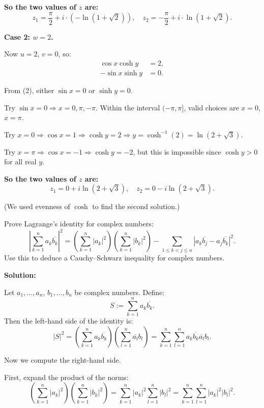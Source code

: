 \textbf{So the two values of \( z \) are:}
\[
z_1 = \frac{\pi}{2} + i \cdot (-\ln(1 + \sqrt{2})), \quad
z_2 = -\frac{\pi}{2} + i \cdot \ln(1 + \sqrt{2}).
\]

\vspace{0.5em}
\textbf{Case 2: \( w = 2 \).}

Now \( u = 2 \), \( v = 0 \), so:
\begin{align*}
\cos x \cosh y &= 2, \\
- \sin x \sinh y &= 0.
\end{align*}

From (2), either \( \sin x = 0 \) or \( \sinh y = 0 \).

Try \( \sin x = 0 \Rightarrow x = 0, \pi, -\pi \).  
Within the interval \( (-\pi, \pi] \), valid choices are \( x = 0 \), \( x = \pi \).

Try \( x = 0 \Rightarrow \cos x = 1 \Rightarrow \cosh y = 2 \Rightarrow y = \cosh^{-1}(2) = \ln(2 + \sqrt{3}) \).

Try \( x = \pi \Rightarrow \cos x = -1 \Rightarrow \cosh y = -2 \), but this is impossible since \( \cosh y > 0 \) for all real \( y \).

\textbf{So the two values of \( z \) are:}
\[
z_1 = 0 + i \ln(2 + \sqrt{3}), \quad
z_2 = 0 - i \ln(2 + \sqrt{3}).
\]

(We used evenness of \( \cosh \) to find the second solution.)


\begin{problembox}
Prove Lagrange’s identity for complex numbers:
\[
\left| \sum_{k=1}^n a_k \overline{b_k} \right|^2 = \left( \sum_{k=1}^n |a_k|^2 \right) \left( \sum_{k=1}^n |b_k|^2 \right) - \sum_{1 \leq k < j \leq n} |a_k \overline{b_j} - a_j \overline{b_k}|^2.
\]
Use this to deduce a Cauchy–Schwarz inequality for complex numbers.
\end{problembox}

\textbf{Solution:}

Let \( a_1, \dots, a_n \), \( b_1, \dots, b_n \) be complex numbers. Define:
\[
S := \sum_{k=1}^n a_k \overline{b_k}.
\]
Then the left-hand side of the identity is:
\[
|S|^2 = \left( \sum_{k=1}^n a_k \overline{b_k} \right) \left( \sum_{l=1}^n \overline{a_l} b_l \right) = \sum_{k=1}^n \sum_{l=1}^n a_k \overline{b_k} \overline{a_l} b_l.
\]

Now we compute the right-hand side.

First, expand the product of the norms:
\[
\left( \sum_{k=1}^n |a_k|^2 \right) \left( \sum_{k=1}^n |b_k|^2 \right)
= \sum_{k=1}^n |a_k|^2 \sum_{l=1}^n |b_l|^2
= \sum_{k=1}^n \sum_{l=1}^n |a_k|^2 |b_l|^2.
\]

